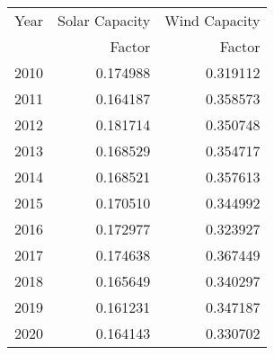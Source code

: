 \begin{tabular}{lrr}
\toprule
Year &  Solar Capacity &   Wind Capacity \\
{} &  Factor &   Factor \\
\midrule
2010 &  0.174988 &  0.319112 \\
2011 &  0.164187 &  0.358573 \\
2012 &  0.181714 &  0.350748 \\
2013 &  0.168529 &  0.354717 \\
2014 &  0.168521 &  0.357613 \\
2015 &  0.170510 &  0.344992 \\
2016 &  0.172977 &  0.323927 \\
2017 &  0.174638 &  0.367449 \\
2018 &  0.165649 &  0.340297 \\
2019 &  0.161231 &  0.347187 \\
2020 &  0.164143 &  0.330702 \\
\bottomrule
\end{tabular}
